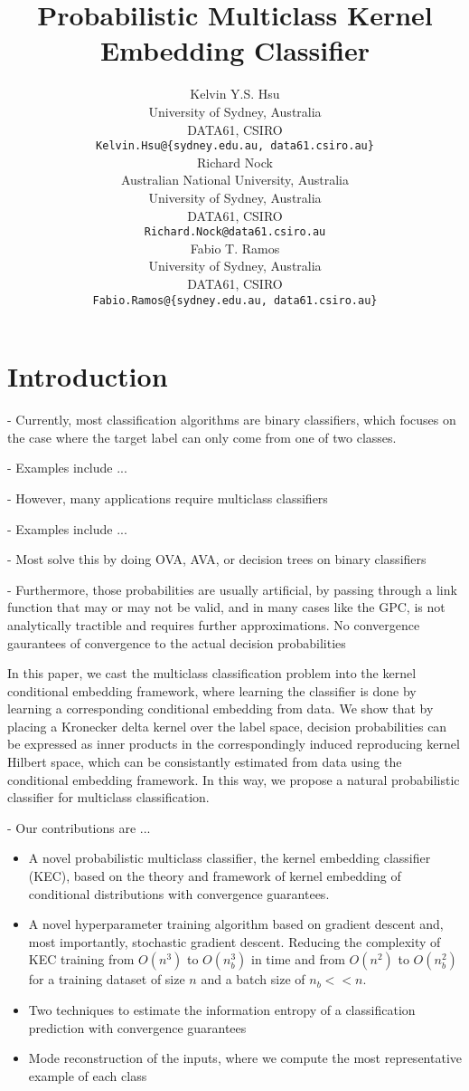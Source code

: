 \documentclass{article}
\title{Probabilistic Multiclass Kernel Embedding Classifier}
\author{
	Kelvin Y.S. Hsu \\
	University of Sydney, Australia\\
	DATA61, CSIRO\\
	\texttt{Kelvin.Hsu@\{sydney.edu.au, data61.csiro.au\}} \\
	\And
	Richard Nock \\
	Australian National University, Australia\\
	University of Sydney, Australia\\
	DATA61, CSIRO\\
	\texttt{Richard.Nock@data61.csiro.au} \\
	\And
	Fabio T. Ramos \\
	University of Sydney, Australia\\
	DATA61, CSIRO\\
	\texttt{Fabio.Ramos@\{sydney.edu.au, data61.csiro.au\}} \\
}
\begin{document}
\maketitle

\begin{abstract}

\end{abstract}

\section{Introduction}
\label{sec:introduction}

	- Currently, most classification algorithms are binary classifiers, which focuses on the case where the target label can only come from one of two classes. 
	
	- Examples include ...
	
	- However, many applications require multiclass classifiers
	
	- Examples include ...
	
	- Most solve this by doing OVA, AVA, or decision trees on binary classifiers \citep{aly2005survey} 
	
	- Furthermore, those probabilities are usually artificial, by passing through a link function that may or may not be valid, and in many cases like the GPC, is not analytically tractible and requires further approximations. No convergence gaurantees of convergence to the actual decision probabilities
	
	In this paper, we cast the multiclass classification problem into the kernel conditional embedding framework, where learning the classifier is done by learning a corresponding conditional embedding from data. We show that by placing a Kronecker delta kernel over the label space, decision probabilities can be expressed as inner products in the correspondingly induced reproducing kernel Hilbert space, which can be consistantly estimated from data using the conditional embedding framework. In this way, we propose a natural probabilistic classifier for multiclass classification.
	
	- Our contributions are ...
	
	\begin{itemize}
		\item A novel probabilistic multiclass classifier, the kernel embedding classifier (KEC), based on the theory and framework of kernel embedding of conditional distributions with convergence guarantees.
		\item A novel hyperparameter training algorithm based on gradient descent and, most importantly, stochastic gradient descent. Reducing the complexity of KEC training from $O(n^{3})$ to $O(n_{b}^{3})$ in time and from $O(n^{2})$ to $O(n_{b}^{2})$ for a training dataset of size $n$ and a batch size of $n_{b} << n$. 
		\item Two techniques to estimate the information entropy of a classification prediction with convergence guarantees
		\item Mode reconstruction of the inputs, where we compute the most representative example of each class
	\end{itemize}
	
\end{document}
